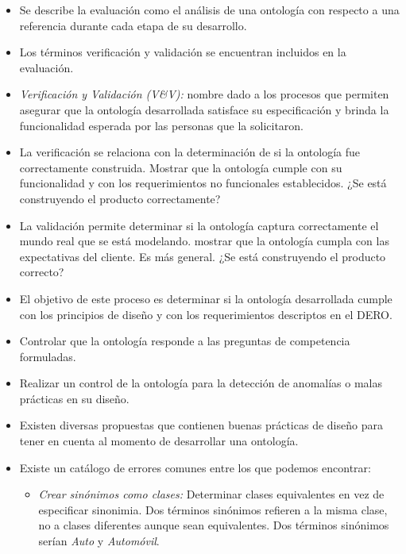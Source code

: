 \documentclass[a4paper,10pt,spanish,oneside]{article}
\begin{document}
\begin{itemize}
\item Se describe la evaluación como el análisis de una ontología con respecto a una referencia durante cada etapa de su desarrollo.

\item Los términos verificación y validación se encuentran incluidos en la evaluación.

\item \textit{Verificación y Validación (V\&V):} nombre dado a los procesos que permiten asegurar que la ontología desarrollada satisface su especificación y brinda la funcionalidad esperada por las personas que la solicitaron.

\item La verificación se relaciona con la determinación de si la ontología fue correctamente construida. Mostrar que la ontología cumple con su funcionalidad y con los requerimientos no funcionales establecidos. ¿Se está construyendo el producto correctamente?

\item La validación permite determinar si la ontología captura correctamente el mundo real que se está modelando. mostrar que la ontología cumpla con las expectativas del cliente. Es más general. ¿Se está construyendo el producto correcto?

\item El objetivo de este proceso es determinar si la ontología desarrollada cumple con los principios de diseño y con los requerimientos descriptos en el DERO.

\item Controlar que la ontología responde a las preguntas de competencia formuladas.

\item Realizar un control de la ontología para la detección de anomalías o malas prácticas en su diseño.

\item Existen diversas propuestas que contienen buenas prácticas de diseño para tener en cuenta al momento de desarrollar una ontología.

\item Existe un catálogo de errores comunes entre los que podemos encontrar:

\begin{itemize}
\item \textit{Crear sinónimos como clases:} Determinar clases equivalentes en vez de especificar sinonimia. Dos términos sinónimos refieren a la misma clase, no a clases diferentes aunque sean equivalentes. Dos términos sinónimos serían \textit{Auto} y \textit{Automóvil}.


\end{itemize}
\end{itemize}
\end{document}
